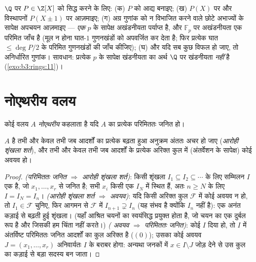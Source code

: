 \begin{method}\label{met:b3:rings:irreducibility}
$\Q$ पर $P \in \Z[X]$ को  सिद्ध करने के लिए: (क) $P$ को आद्य
बनाइए; (ख) $P(X)$ पर और विस्थापनों $P(X \pm
1)$ पर  आज़माइए;
(ग) अग्र गुणांक को न विभाजित करने वाले छोटे अभाज्यों के सापेक्ष
अपचयन आज़माइए --- \emph{एक} $p$ के सापेक्ष अखंडनीयता पर्याप्त
है, और $\mathbb F_p$ पर अखंडनीयता एक परिमित जाँच है (मूल न होना घात-$1$
गुणनखंडों को अपवर्जित कर देता है; फिर प्रत्येक घात $\leq \deg P/2$ के
परिमित गुणनखंडों की जाँच कीजिए); (घ) और यदि सब कुछ विफल हो जाए,
तो अनिर्धारित गुणांक। सावधान: प्रत्येक $p$ के सापेक्ष
खंडनीयता का अर्थ $\Q$ पर खंडनीयता \emph{नहीं} है (\cref{exo:b3:rings:11})।
\end{method}

\section{नोएथरीय वलय}

\begin{definition}\label{def:b3:rings:noetherian}
कोई वलय $A$ \emph{नोएथरीय} कहलाता है यदि
$A$ का प्रत्येक  परिमिततः जनित हो।
\end{definition}

\begin{proposition}\label{prop:b3:rings:noethacc}
$A$  है तभी और केवल तभी जब आदर्शों का प्रत्येक बढ़ता हुआ
अनुक्रम अंततः अचर हो जाए (\emph{आरोही शृंखला शर्त}), और तभी और
केवल तभी जब आदर्शों के प्रत्येक अरिक्त कुल में (अंतर्वेशन के
सापेक्ष) कोई  अवयव हो।
\end{proposition}

\begin{proof}
\emph{(परिमिततः जनित $\Rightarrow$ आरोही शृंखला शर्त)}: किसी शृंखला
$I_1 \subseteq I_2
\subseteq \cdots$ के लिए सम्मिलन $I$ एक  है, जो $x_1,
\dots, x_r$ से जनित है;
सभी $x_i$ किसी एक $I_N$ में स्थित हैं, अतः $n \geq N$ के लिए $I = I_N = I_n$।
\emph{(आरोही शृंखला शर्त $\Rightarrow$  अवयव)}: यदि किसी अरिक्त
कुल $\mathcal F$ में कोई  अवयव न हो, तो $I_1 \in
\mathcal F$ चुनिए, फिर आगमन से
$\mathcal F$ में $I_{n+1} \supsetneq I_n$ (यह संभव है क्योंकि $I_n$  नहीं है): एक
अनंत कड़ाई से बढ़ती हुई शृंखला। (यहाँ आश्रित चयनों का स्वयंसिद्ध
प्रयुक्त होता है, जो चयन का एक दुर्बल रूप है और जिसकी हम चिंता
नहीं करते।)
\emph{( अवयव $\Rightarrow$ परिमिततः जनित)}: कोई  $I$ दिया
हो, तो $I$ में अंतर्विष्ट परिमिततः जनित आदर्शों का कुल अरिक्त
है ($(0)$); उसका कोई  अवयव $J = (x_1, \dots, x_r)$ अनिवार्यतः $I$ के
बराबर होगा: अन्यथा जनकों में $x \in I \setminus J$ जोड़ देने से उस कुल का कड़ाई
से बड़ा सदस्य बन जाता।
\end{proof}

